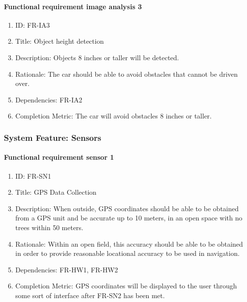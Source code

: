 \documentclass[compsoc,draftclsnofoot,onecolumn,10pt]{IEEEtran}
\begin{document}
	\paragraph{Functional requirement image analysis 3}
		\begin{enumerate}
			\item ID: FR-IA3
			\item Title: Object height detection
			\item Description: Objects 8 inches or taller will be detected.
			\item Rationale: The car should be able to avoid obstacles that cannot be driven over.
			\item Dependencies: FR-IA2
			\item Completion Metric: The car will avoid obstacles 8 inches or taller.
		\end{enumerate}

\subsubsection{System Feature: Sensors}

	\paragraph{Functional requirement sensor 1}
    		\begin{enumerate}
    			\item ID: FR-SN1
    			\item Title: GPS Data Collection
    			\item Description: When outside, GPS coordinates should be able to be obtained from a GPS unit and be accurate up to 10 meters, in an open space with no trees within 50 meters. 
    			\item Rationale: Within an open field, this accuracy should be able to be obtained in order to provide reasonable locational accuracy to be used in navigation.
    			\item Dependencies: FR-HW1, FR-HW2
			\item Completion Metric: GPS coordinates will be displayed to the user through some sort of interface after FR-SN2 has been met. 
    		\end{enumerate}
		
\end{document}
